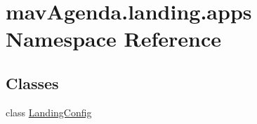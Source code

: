 \hypertarget{namespacemavAgenda_1_1landing_1_1apps}{}\section{mav\+Agenda.\+landing.\+apps Namespace Reference}
\label{namespacemavAgenda_1_1landing_1_1apps}
\subsection*{Classes}
\begin{DoxyCompactItemize}
\item 
class \mbox{\hyperlink{classmavAgenda_1_1landing_1_1apps_1_1LandingConfig}{Landing\+Config}}
\end{DoxyCompactItemize}
